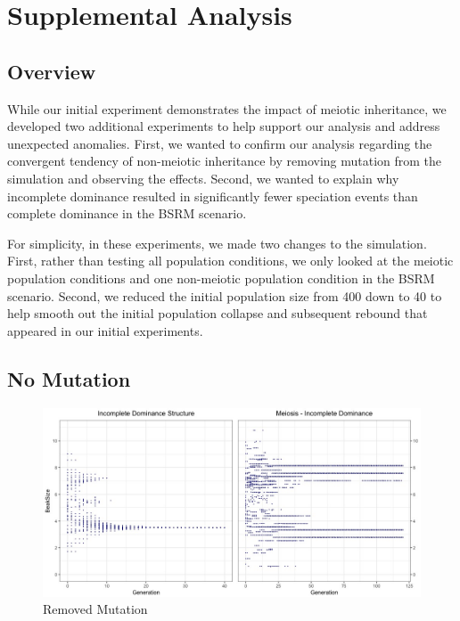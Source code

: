 \documentclass[conference]{IEEEtran}
\begin{document}
\section{Supplemental Analysis}

\subsection{Overview}

While our initial experiment demonstrates the impact of meiotic inheritance, we developed two additional experiments to help support our analysis and address unexpected anomalies. First, we wanted to confirm our analysis regarding the convergent tendency of non-meiotic inheritance by removing mutation from the simulation and observing the effects. Second, we wanted to explain why incomplete dominance resulted in significantly fewer speciation events than complete dominance in the BSRM scenario. 

For simplicity, in these experiments, we made two changes to the simulation. First, rather than testing all population conditions, we only looked at the meiotic population conditions and one non-meiotic population condition in the BSRM scenario. Second, we reduced the initial population size from 400 down to 40 to help smooth out the initial population collapse and subsequent rebound that appeared in our initial experiments.



\subsection{No Mutation}

\begin{figure}[ht]
    \centering
    \includegraphics[width=\linewidth]{DATA_JPG/EXP4}
    \caption{Removed Mutation}
    \label{fig:EXP4}
\end{figure}
\end{document}
